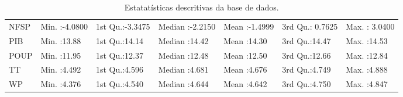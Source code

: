 \begin{table}[!htb]
\begin{tabular}{lllllll}
       NFSP & Min.   :-4.0800   & 1st Qu.:-3.3475   & Median :-2.2150   & Mean   :-1.4999   & 3rd Qu.: 0.7625   & Max.   : 3.0400   \\ 
       PIB & Min.   :13.88   & 1st Qu.:14.14   & Median :14.42   & Mean   :14.30   & 3rd Qu.:14.47   & Max.   :14.53   \\ 
       POUP & Min.   :11.95   & 1st Qu.:12.37   & Median :12.48   & Mean   :12.50   & 3rd Qu.:12.66   & Max.   :12.84   \\ 
        TT & Min.   :4.492   & 1st Qu.:4.596   & Median :4.681   & Mean   :4.676   & 3rd Qu.:4.749   & Max.   :4.888   \\ 
        WP & Min.   :4.376   & 1st Qu.:4.540   & Median :4.644   & Mean   :4.642   & 3rd Qu.:4.750   & Max.   :4.847   \\ 
   \hline
\end{tabular}
\caption{Estatat\'{i}sticas descritivas da base de dados.} 
\label{sumario_dados}
\end{table}
